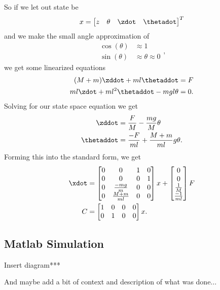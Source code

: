 \documentclass[10pt]{article}
\renewcommand{\matlab}{{\sc Matlab }}
\begin{document}
So if we let out state be
\begin{equation}
  x = 
  \begin{bmatrix}
    z & \theta & \zdot & \thetadot
  \end{bmatrix}^T
\end{equation}
and we make the small angle approximation of 
\begin{equation}
  \begin{split}
    \cos(\theta) &\approx 1\\
    \sin(\theta) &\approx \theta \approx 0
  \end{split},
\end{equation}
we get some linearized equations
\begin{equation}
  \begin{split}
    (M+m)\zddot + ml\thetaddot &= F\\
    ml\zdot + ml^2\thetaddot - mgl\theta &= 0.
  \end{split}
\end{equation}
Solving for our state space equation we get
\begin{equation}
  \begin{split}
    \zddot &= \frac{F}{M} - \frac{mg}{M}\theta\\
    \thetaddot &= \frac{-F}{ml} + \frac{M+m}{ml}g\theta.
  \end{split}
\end{equation}
Forming this into the standard form, we get
\begin{equation}
\begin{split}
  \xdot &=
  \begin{bmatrix}
    0 & 0 & 1 & 0\\
    0 & 0 & 0 & 1\\
    0 & \frac{-mg}{m} & 0 & 0\\
    0 & \frac{M+m}{ml} & 0 & 0\\
  \end{bmatrix}x + 
  \begin{bmatrix}
    0 \\ 0 \\ \frac{1}{M} \\ \frac{-1}{ml}
  \end{bmatrix}F\\
  C &= %
  \begin{bmatrix}
    1 &0 &0& 0\\
    0 &1& 0& 0
  \end{bmatrix}
  x.
\end{split}
\end{equation}
\subsection{\matlab Simulation}

Insert diagram***

And maybe add a bit of context and description of what was done... 




% 
% 
\end{document}
